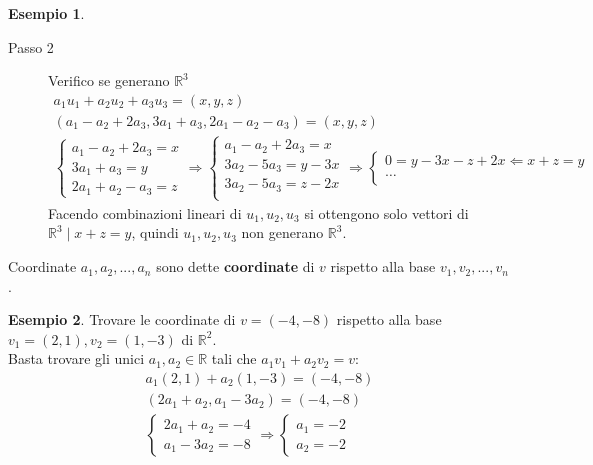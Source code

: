 \documentclass[a4paper]{article}
\theoremstyle{definition}
\newtheorem*{es}{Esempio}
\begin{document}
\begin{es}
\begin{description}
		\item[Passo 2] Verifico se generano $\mathbb{R}^3$
		      \begin{align*}
			      a_1u_1 + a_2u_2 + a_3u_3 = (x, y, z)                         \\
			      (a_1 - a_2 + 2a_3, 3a_1 + a_3, 2a_1 - a_2 - a_3) = (x, y, z) \\
			      \begin{cases}
				      a_1 - a_2 + 2a_3 = x \\
				      3a_1 + a_3 = y       \\
				      2a_1 + a_2 - a_3 = z
			      \end{cases}
			      \Rightarrow
			      \begin{cases}
				      a_1 - a_2 + 2a_3 = x \\
				      3a_2 - 5a_3 = y - 3x \\
				      3a_2 - 5a_3 = z - 2x \\
			      \end{cases}
			      \Rightarrow
			      \begin{cases}
				      0 = y - 3x - z + 2x \Leftarrow x + z = y \\
				      \dots                                    \\
			      \end{cases}
		      \end{align*}
		      Facendo combinazioni lineari di $u_1, u_2, u_3$ si ottengono solo vettori di $\mathbb{R}^3 \mid x + z = y$, quindi $u_1, u_2, u_3$ non generano $\mathbb{R}^3$.
	\end{description}
\end{es}

\begin{deff}{Coordinate}{}
	$a_1, a_2, ..., a_n$ sono dette \textbf{coordinate} di $v$ rispetto alla base $v_1, v_2, ..., v_n$.
\end{deff}

\begin{es}
	Trovare le coordinate di $v = (-4, -8)$ rispetto alla base $v_1 = (2, 1), v_2 = (1, -3)$ di $\mathbb{R}^2$. \\
	Basta trovare gli unici $a_1, a_2 \in \mathbb{R}$ tali che $a_1v_1 + a_2v_2 = v$:
	\begin{align*}
		a_1(2, 1) + a_2(1, -3) = (-4, -8) \\
		(2a_1 + a_2, a_1 - 3a_2) = (-4, -8) \\
		\begin{cases}
			2a_1 + a_2 = -4 \\
			a_1 - 3a_2 = -8
		\end{cases}
		\Rightarrow
		\begin{cases}
			a_1 = -2 \\
			a_2 = -2
		\end{cases}
	\end{align*}
\end{es}
\end{document}
